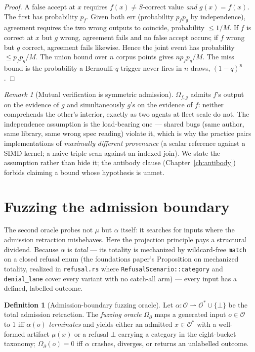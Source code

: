 \documentclass[11pt,oneside]{book}
\theoremstyle{definition}
\newtheorem{definition}{Definition}[chapter]
\theoremstyle{plain}
\theoremstyle{remark}
\newtheorem*{remark}{Remark}
\newcommand{\Obs}{\mathcal{O}}                 %
\newcommand{\Adm}{\mathcal{O}^{*}}             %
\newcommand{\muop}{\mu}                        %
\newcommand{\adm}{\alpha}                      %
\newcommand{\Rfsl}{\bot}                        %
\newcommand{\code}[1]{\texttt{#1}}
\begin{document}
\begin{proof}
A false accept at $x$ requires $f(x)\ne S$-correct value \emph{and} $g(x)=f(x)$. The first has
probability $p_f$. Given both err (probability $p_f p_g$ by independence), agreement requires the
two wrong outputs to coincide, probability $\le 1/M$. If $f$ is correct at $x$ but $g$ wrong,
agreement fails and no false accept occurs; if $f$ wrong but $g$ correct, agreement fails
likewise. Hence the joint event has probability $\le p_f p_g/M$. The union bound over $n$
corpus points gives $n p_f p_g/M$. The miss bound is the probability a Bernoulli-$q$ trigger
never fires in $n$ draws, $(1-q)^n$.
\end{proof}

\begin{remark}[Mutual verification is symmetric admission]
$\Omega_{f,g}$ admits $f$'s output on the evidence of $g$ and simultaneously $g$'s on the
evidence of $f$: neither comprehends the other's interior, exactly as two agents at fleet scale
do not. The independence assumption is the load-bearing one --- shared bugs (same author, same
library, same wrong spec reading) violate it, which is why the practice pairs implementations of
\emph{maximally different provenance} (a scalar reference against a SIMD kernel; a naive triple
scan against an indexed join). We state the assumption rather than hide it; the antibody clause
(Chapter~\ref{ch:antibody}) forbids claiming a bound whose hypothesis is unmet.
\end{remark}

\section{Fuzzing the admission boundary}

The second oracle probes not $\muop$ but $\adm$ itself: it searches for inputs where the
admission retraction misbehaves. Here the projection principle pays a structural dividend.
Because $\adm$ is \emph{total} --- its totality is mechanized by wildcard-free \code{match} on a
closed refusal enum (the foundations paper's Proposition on mechanized totality, realized in
\code{refusal.rs} where \code{RefusalScenario::category} and \code{denial\_lane} cover every
variant with no catch-all arm) --- every input has a defined, labelled outcome.

\begin{definition}[Admission-boundary fuzzing oracle]\label{def:fuzz}
Let $\adm:\Obs\rightharpoonup\Adm\cup\{\Rfsl\}$ be the total admission retraction. The
\emph{fuzzing oracle} $\Omega_\partial$ maps a generated input $o\in\Obs$ to $1$ iff $\adm(o)$
\emph{terminates} and yields either an admitted $x\in\Adm$ with a well-formed artifact
$\muop(x)$ or a refusal $\Rfsl$ carrying a category in the eight-bucket taxonomy; $\Omega_\partial(o)=0$
iff $\adm$ crashes, diverges, or returns an unlabelled outcome.
\end{definition}
\end{document}
